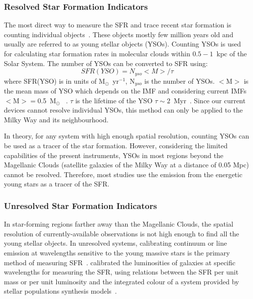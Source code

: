 \subsubsection{Resolved Star Formation Indicators}
The most direct way to measure the SFR and trace recent star formation is counting individual objects~\citep{Kennicutt12}. 
These objects mostly few million years old and usually are referred to as young stellar objects (YSOs). 
Counting YSOs is used for calculating star formation rates in molecular clouds within $0.5- 1$~kpc of the Solar System. 
The number of YSOs can be converted to SFR using: 
\begin{equation}
SFR(YSO) = N_{yso} <M>/\tau 
\end{equation}
where SFR(YSO) is in units of M$_{\odot}$~yr$^{-1}$, N$_{yso}$ is the number of YSOs.
$<$M$>$ is the mean mass of YSO which depends on the IMF and considering current IMFs $<$M$> = $0.5~M$_{\odot}$ ~\citep[][]{Kennicutt12}. 
$\tau$ is the lifetime of the YSO  $\tau \sim 2$~Myr~\citep{Evans09}. 
Since our current devices cannot resolve individual YSOs, this method can only be applied to the Milky Way and its neighbourhood. 

In theory, for any system with high enough spatial resolution, counting YSOs can be used as a tracer of the star formation. 
However, considering the limited capabilities of the present instruments, YSOs in most regions beyond the Magellanic Clouds (satellite galaxies of the Milky Way at a distance of 0.05 Mpc) cannot be resolved. 
Therefore, most studies use the emission from the energetic young stars as a tracer of the SFR. 



\subsubsection{Unresolved Star Formation Indicators}

In star-forming regions farther away than the Magellanic Clouds, the spatial resolution of currently-available observations is not high enough to find all the young stellar objects. 
In unresolved systems, calibrating continuum or line emission at wavelengths sensitive to the young massive stars is the primary method of measuring SFR~\citep[e.g.,][]{Kennicutt98b, Kewley02, Bell03, Calzetti07, Calzetti08, Calzetti10, Calzetti13, Kennicutt07, Kennicutt09, Boquien10, Hao11, Kennicutt12}. 
\cite{Kennicutt98b} calibrated the luminosities of galaxies at specific wavelengths for measuring the SFR, using relations between the SFR per unit mass or per unit luminosity and the integrated colour of a system provided by stellar populations synthesis models~\citep[e.g.,][]{Bruzual93}. 

